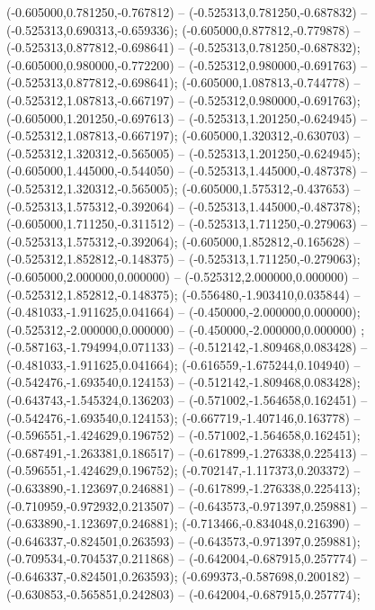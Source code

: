  (-0.605000,0.781250,-0.767812) -- (-0.525313,0.781250,-0.687832) -- (-0.525313,0.690313,-0.659336);
 (-0.605000,0.877812,-0.779878) -- (-0.525313,0.877812,-0.698641) -- (-0.525313,0.781250,-0.687832);
 (-0.605000,0.980000,-0.772200) -- (-0.525312,0.980000,-0.691763) -- (-0.525313,0.877812,-0.698641);
 (-0.605000,1.087813,-0.744778) -- (-0.525312,1.087813,-0.667197) -- (-0.525312,0.980000,-0.691763);
 (-0.605000,1.201250,-0.697613) -- (-0.525313,1.201250,-0.624945) -- (-0.525312,1.087813,-0.667197);
 (-0.605000,1.320312,-0.630703) -- (-0.525312,1.320312,-0.565005) -- (-0.525313,1.201250,-0.624945);
 (-0.605000,1.445000,-0.544050) -- (-0.525313,1.445000,-0.487378) -- (-0.525312,1.320312,-0.565005);
 (-0.605000,1.575312,-0.437653) -- (-0.525313,1.575312,-0.392064) -- (-0.525313,1.445000,-0.487378);
 (-0.605000,1.711250,-0.311512) -- (-0.525313,1.711250,-0.279063) -- (-0.525313,1.575312,-0.392064);
 (-0.605000,1.852812,-0.165628) -- (-0.525312,1.852812,-0.148375) -- (-0.525313,1.711250,-0.279063);
 (-0.605000,2.000000,0.000000) -- (-0.525312,2.000000,0.000000) -- (-0.525312,1.852812,-0.148375);
 (-0.556480,-1.903410,0.035844) -- (-0.481033,-1.911625,0.041664) -- (-0.450000,-2.000000,0.000000);
 (-0.525312,-2.000000,0.000000) -- (-0.450000,-2.000000,0.000000) ;
 (-0.587163,-1.794994,0.071133) -- (-0.512142,-1.809468,0.083428) -- (-0.481033,-1.911625,0.041664);
 (-0.616559,-1.675244,0.104940) -- (-0.542476,-1.693540,0.124153) -- (-0.512142,-1.809468,0.083428);
 (-0.643743,-1.545324,0.136203) -- (-0.571002,-1.564658,0.162451) -- (-0.542476,-1.693540,0.124153);
 (-0.667719,-1.407146,0.163778) -- (-0.596551,-1.424629,0.196752) -- (-0.571002,-1.564658,0.162451);
 (-0.687491,-1.263381,0.186517) -- (-0.617899,-1.276338,0.225413) -- (-0.596551,-1.424629,0.196752);
 (-0.702147,-1.117373,0.203372) -- (-0.633890,-1.123697,0.246881) -- (-0.617899,-1.276338,0.225413);
 (-0.710959,-0.972932,0.213507) -- (-0.643573,-0.971397,0.259881) -- (-0.633890,-1.123697,0.246881);
 (-0.713466,-0.834048,0.216390) -- (-0.646337,-0.824501,0.263593) -- (-0.643573,-0.971397,0.259881);
 (-0.709534,-0.704537,0.211868) -- (-0.642004,-0.687915,0.257774) -- (-0.646337,-0.824501,0.263593);
 (-0.699373,-0.587698,0.200182) -- (-0.630853,-0.565851,0.242803) -- (-0.642004,-0.687915,0.257774);

